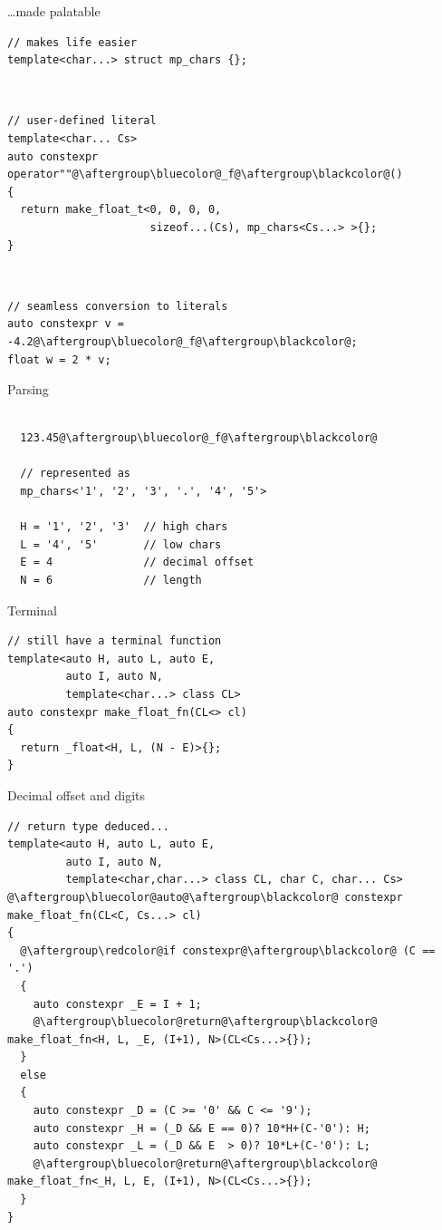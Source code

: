 \documentclass[xcolor=dvipsnames]{beamer}
\begin{document}
\begin{frame}[fragile]{\ldots made palatable}
\begin{lstlisting}
// makes life easier
template<char...> struct mp_chars {};
\end{lstlisting}

~

\begin{lstlisting}
// user-defined literal
template<char... Cs>
auto constexpr operator""@\aftergroup\bluecolor@_f@\aftergroup\blackcolor@()
{
  return make_float_t<0, 0, 0, 0,
                      sizeof...(Cs), mp_chars<Cs...> >{};
}
\end{lstlisting}

~

\begin{lstlisting}
// seamless conversion to literals
auto constexpr v = -4.2@\aftergroup\bluecolor@_f@\aftergroup\blackcolor@;
float w = 2 * v;
\end{lstlisting}
\end{frame}


\begin{frame}[fragile]{Parsing}
\begin{lstlisting}

  123.45@\aftergroup\bluecolor@_f@\aftergroup\blackcolor@

  // represented as
  mp_chars<'1', '2', '3', '.', '4', '5'>

  H = '1', '2', '3'  // high chars
  L = '4', '5'       // low chars
  E = 4              // decimal offset
  N = 6              // length

\end{lstlisting}
\end{frame}


\begin{frame}[fragile]{Terminal}
\begin{lstlisting}
// still have a terminal function
template<auto H, auto L, auto E,
         auto I, auto N,
         template<char...> class CL>
auto constexpr make_float_fn(CL<> cl)
{
  return _float<H, L, (N - E)>{};
}
\end{lstlisting}
\end{frame}


\begin{frame}[fragile]{Decimal offset and digits}
\begin{lstlisting}
// return type deduced...
template<auto H, auto L, auto E,
         auto I, auto N,
         template<char,char...> class CL, char C, char... Cs>
@\aftergroup\bluecolor@auto@\aftergroup\blackcolor@ constexpr make_float_fn(CL<C, Cs...> cl)
{
  @\aftergroup\redcolor@if constexpr@\aftergroup\blackcolor@ (C == '.')
  {
    auto constexpr _E = I + 1;
    @\aftergroup\bluecolor@return@\aftergroup\blackcolor@ make_float_fn<H, L, _E, (I+1), N>(CL<Cs...>{});
  }
  else
  {
    auto constexpr _D = (C >= '0' && C <= '9');
    auto constexpr _H = (_D && E == 0)? 10*H+(C-'0'): H;
    auto constexpr _L = (_D && E  > 0)? 10*L+(C-'0'): L;
    @\aftergroup\bluecolor@return@\aftergroup\blackcolor@ make_float_fn<_H, L, E, (I+1), N>(CL<Cs...>{});
  }
}
\end{lstlisting}
\end{frame}
\end{document}
